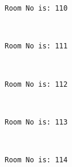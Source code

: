 \documentclass[11pt]{article}
\begin{document}
    \begin{Verbatim}[commandchars=\\\{\}]
Room No is: 110

    \end{Verbatim}

    \begin{center}
    \end{center}
    { \hspace*{\fill} \\}
    
    \begin{Verbatim}[commandchars=\\\{\}]
Room No is: 111

    \end{Verbatim}

    \begin{center}
    \end{center}
    { \hspace*{\fill} \\}
    
    \begin{Verbatim}[commandchars=\\\{\}]
Room No is: 112

    \end{Verbatim}

    \begin{center}
    \end{center}
    { \hspace*{\fill} \\}
    
    \begin{Verbatim}[commandchars=\\\{\}]
Room No is: 113

    \end{Verbatim}

    \begin{center}
    \end{center}
    { \hspace*{\fill} \\}
    
    \begin{Verbatim}[commandchars=\\\{\}]
Room No is: 114

    \end{Verbatim}
\end{document}
